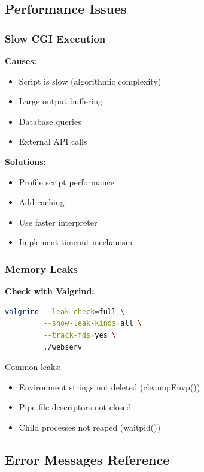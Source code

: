 \documentclass[11pt,a4paper]{article}
\begin{document}
\subsection{Performance Issues}

\subsubsection{Slow CGI Execution}

\textbf{Causes:}
\begin{itemize}
    \item Script is slow (algorithmic complexity)
    \item Large output buffering
    \item Database queries
    \item External API calls
\end{itemize}

\textbf{Solutions:}
\begin{itemize}
    \item Profile script performance
    \item Add caching
    \item Use faster interpreter
    \item Implement timeout mechanism
\end{itemize}

\subsubsection{Memory Leaks}

\textbf{Check with Valgrind:}

\begin{lstlisting}[language=bash]
valgrind --leak-check=full \
         --show-leak-kinds=all \
         --track-fds=yes \
         ./webserv
\end{lstlisting}

Common leaks:
\begin{itemize}
    \item Environment strings not deleted (cleanupEnvp())
    \item Pipe file descriptors not closed
    \item Child processes not reaped (waitpid())
\end{itemize}

\subsection{Error Messages Reference}
\end{document}
